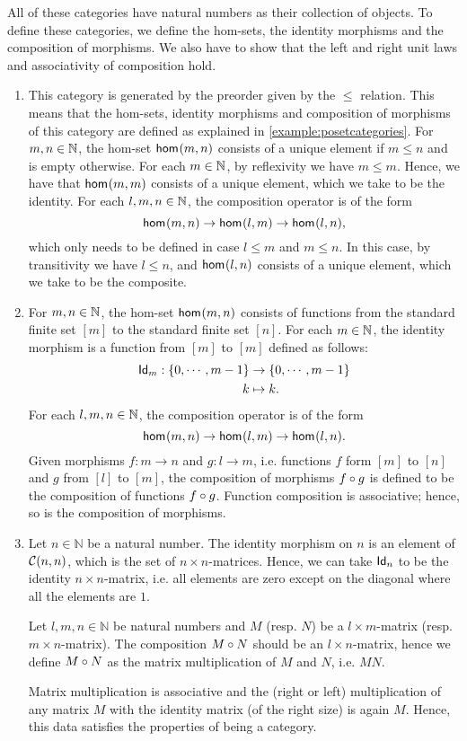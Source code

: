 \begin{solution}
\label{sol:categories_with_natural_numbers}
All of these categories have natural numbers as their collection of objects. To define these categories, we define the hom-sets, the identity morphisms and the composition of morphisms. We also have to show that the left and right unit laws and associativity of composition hold.  
\begin{enumerate}
\item This category is generated by the preorder given by the $\leq$ relation. This means that the hom-sets, identity morphisms and composition of morphisms of this category are defined as explained in \cref{example:posetcategories}. 
For $m,n \in \NN$, the hom-set $\Hom m n$ consists of a unique element if $m \leq n$ and is empty otherwise. For each $m \in \NN$, by reflexivity we have $m \leq m$. Hence, we have that $\Hom m m$ consists of a unique element, which we take to be the identity.
For each $l, m, n\in \NN$, the composition operator is of the form
\[
\Hom m n \to \Hom l m \to \Hom l n,
\]
which only needs to be defined in case $l \leq m$ and $m \leq n$. In this case, by transitivity we have $l \leq n$, and $\Hom l n$ consists of a unique element, which we take to be the composite. 
\item For $m,n \in \NN$, the hom-set $\Hom m n$ consists of functions from the standard finite set $[m]$ to the standard finite set $[n]$.
For each $m \in \NN$, the identity morphism is a function from $[m]$ to $[m]$ defined as follows: 
\begin{align*}
	\Id[m] :  \{0, \cdots , m-1\} & \to \{0, \cdots , m-1\} \\
	k & \mapsto k.
\end{align*}
For each $l, m, n\in \NN$, the composition operator is of the form
\[
\Hom m n \to \Hom l m \to \Hom l n. 
\]
Given morphisms $f : m \to n$ and $g : l \to m $, i.e. functions $f$ form $[m]$ to $[n]$ and $g$ from $[l]$ to $[m]$, the composition of morphisms $\co{g}{f}$ is defined to be the composition of functions $\co{g}{f}$.
Function composition is associative; hence, so is the composition of morphisms. 
\item Let $n\in \mathbb{N}$ be a natural number. The identity morphism on $n$ is an element of $\CHom{\CC}{n}{n}$, which is the set of $n\times n$-matrices. 
Hence, we can take $\Id[n]$ to be the identity $n\times n$-matrix, i.e. all elements are zero except on the diagonal where all the elements are $1$.

Let $l,m,n \in\mathbb{N}$ be natural numbers and $M$ (resp. $N$) be a $l\times m$-matrix (resp. $m\times n$-matrix). The composition $\co{N}{M}$ should be an $l\times n$-matrix, hence we define $\co{N}{M}$ as the matrix multiplication of $M$ and $N$, i.e. $MN$.

Matrix multiplication is associative and the (right or left) multiplication of any matrix $M$ with the identity matrix (of the right size) is again $M$. Hence, this data satisfies the properties of being a category. 

\end{enumerate}
\end{solution}



